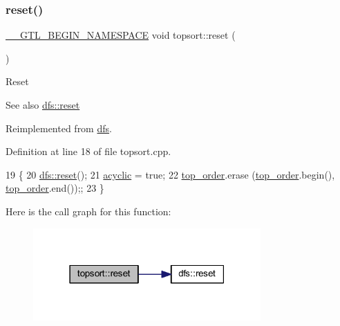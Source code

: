 \subsubsection{\texorpdfstring{reset()}{reset()}}
{\footnotesize\ttfamily \mbox{\hyperlink{_g_t_l_8h_a2d9f24096ac60918452dd51f32b64aa9}{\+\_\+\+\_\+\+G\+T\+L\+\_\+\+B\+E\+G\+I\+N\+\_\+\+N\+A\+M\+E\+S\+P\+A\+CE}} void topsort\+::reset (\begin{DoxyParamCaption}{ }\end{DoxyParamCaption})\hspace{0.3cm}{\ttfamily [virtual]}}

Reset \begin{DoxySeeAlso}{See also}
\mbox{\hyperlink{classdfs_affaffda8be8418d6dbf396c5b1d6b81a}{dfs\+::reset}} 
\end{DoxySeeAlso}


Reimplemented from \mbox{\hyperlink{classdfs_affaffda8be8418d6dbf396c5b1d6b81a}{dfs}}.



Definition at line 18 of file topsort.\+cpp.


\begin{DoxyCode}
19 \{
20     \mbox{\hyperlink{classdfs_affaffda8be8418d6dbf396c5b1d6b81a}{dfs::reset}}();
21     \mbox{\hyperlink{classtopsort_a01d94e7627a5660836cc0765ec15727a}{acyclic}} = \textcolor{keyword}{true};
22     \mbox{\hyperlink{classtopsort_a8b18b1b7ce816683694d6ac567e55cb8}{top\_order}}.erase (\mbox{\hyperlink{classtopsort_a8b18b1b7ce816683694d6ac567e55cb8}{top\_order}}.begin(), \mbox{\hyperlink{classtopsort_a8b18b1b7ce816683694d6ac567e55cb8}{top\_order}}.end());;
23 \}
\end{DoxyCode}
Here is the call graph for this function\+:\nopagebreak
\begin{figure}[H]
\begin{center}
\leavevmode
\includegraphics[width=247pt]{classtopsort_aa3d9ccc7c632dac6b7303e9828c14f62_cgraph}
\end{center}
\end{figure}
\mbox{\label{classdfs_af56fa2b736f0b924dba1257e18ba4b61}} 
